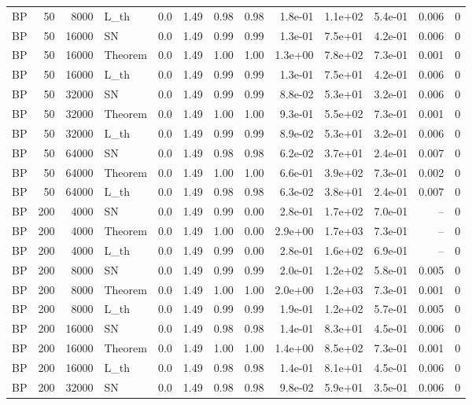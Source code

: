\begin{tabular}{lrrlrrrrrrrrr}
BP & 50 & 8000 & L\_th & 0.0 & 1.49 & 0.98 & 0.98 & 1.8e-01 & 1.1e+02 & 5.4e-01 & 0.006 & 0 \\
BP & 50 & 16000 & SN & 0.0 & 1.49 & 0.99 & 0.99 & 1.3e-01 & 7.5e+01 & 4.2e-01 & 0.006 & 0 \\
BP & 50 & 16000 & Theorem & 0.0 & 1.49 & 1.00 & 1.00 & 1.3e+00 & 7.8e+02 & 7.3e-01 & 0.001 & 0 \\
BP & 50 & 16000 & L\_th & 0.0 & 1.49 & 0.99 & 0.99 & 1.3e-01 & 7.5e+01 & 4.2e-01 & 0.006 & 0 \\
BP & 50 & 32000 & SN & 0.0 & 1.49 & 0.99 & 0.99 & 8.8e-02 & 5.3e+01 & 3.2e-01 & 0.006 & 0 \\
BP & 50 & 32000 & Theorem & 0.0 & 1.49 & 1.00 & 1.00 & 9.3e-01 & 5.5e+02 & 7.3e-01 & 0.001 & 0 \\
BP & 50 & 32000 & L\_th & 0.0 & 1.49 & 0.99 & 0.99 & 8.9e-02 & 5.3e+01 & 3.2e-01 & 0.006 & 0 \\
BP & 50 & 64000 & SN & 0.0 & 1.49 & 0.98 & 0.98 & 6.2e-02 & 3.7e+01 & 2.4e-01 & 0.007 & 0 \\
BP & 50 & 64000 & Theorem & 0.0 & 1.49 & 1.00 & 1.00 & 6.6e-01 & 3.9e+02 & 7.3e-01 & 0.002 & 0 \\
BP & 50 & 64000 & L\_th & 0.0 & 1.49 & 0.98 & 0.98 & 6.3e-02 & 3.8e+01 & 2.4e-01 & 0.007 & 0 \\
BP & 200 & 4000 & SN & 0.0 & 1.49 & 0.99 & 0.00 & 2.8e-01 & 1.7e+02 & 7.0e-01 & -- & 0 \\
BP & 200 & 4000 & Theorem & 0.0 & 1.49 & 1.00 & 0.00 & 2.9e+00 & 1.7e+03 & 7.3e-01 & -- & 0 \\
BP & 200 & 4000 & L\_th & 0.0 & 1.49 & 0.99 & 0.00 & 2.8e-01 & 1.6e+02 & 6.9e-01 & -- & 0 \\
BP & 200 & 8000 & SN & 0.0 & 1.49 & 0.99 & 0.99 & 2.0e-01 & 1.2e+02 & 5.8e-01 & 0.005 & 0 \\
BP & 200 & 8000 & Theorem & 0.0 & 1.49 & 1.00 & 1.00 & 2.0e+00 & 1.2e+03 & 7.3e-01 & 0.001 & 0 \\
BP & 200 & 8000 & L\_th & 0.0 & 1.49 & 0.99 & 0.99 & 1.9e-01 & 1.2e+02 & 5.7e-01 & 0.005 & 0 \\
BP & 200 & 16000 & SN & 0.0 & 1.49 & 0.98 & 0.98 & 1.4e-01 & 8.3e+01 & 4.5e-01 & 0.006 & 0 \\
BP & 200 & 16000 & Theorem & 0.0 & 1.49 & 1.00 & 1.00 & 1.4e+00 & 8.5e+02 & 7.3e-01 & 0.001 & 0 \\
BP & 200 & 16000 & L\_th & 0.0 & 1.49 & 0.98 & 0.98 & 1.4e-01 & 8.1e+01 & 4.5e-01 & 0.006 & 0 \\
BP & 200 & 32000 & SN & 0.0 & 1.49 & 0.98 & 0.98 & 9.8e-02 & 5.9e+01 & 3.5e-01 & 0.006 & 0 \\

\end{tabular}
